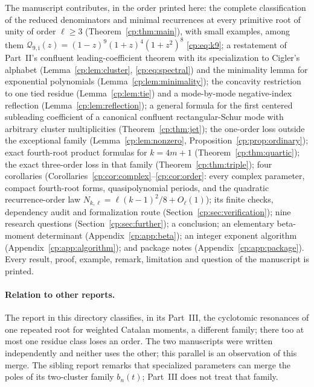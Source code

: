 \documentclass[11pt]{article}
\theoremstyle{definition}
\theoremstyle{remark}
\newcommand{\QQ}{\mathscr Q}
\newcommand{\ii}{\mathrm i}
\theoremstyle{definition}
\theoremstyle{plain}
\numberwithin{equation}{section}
\begin{document}
The manuscript contributes, in the order printed here: the complete
classification of the reduced denominators and minimal recurrences at every
primitive root of unity of order $\ell\ge3$ (Theorem~\ref{cp:thm:main}),
with small examples, among them
$\QQ_{9,\ii}(z)=(1-z)^9(1+z)^4(1+z^2)^8$ \eqref{cp:eq:k9}; a restatement of
Part~II's confluent leading-coefficient theorem with its specialization to
Cigler's alphabet (Lemma~\ref{cp:lem:cluster}, \eqref{cp:eq:spectral}) and
the minimality lemma for exponential polynomials
(Lemma~\ref{cp:lem:minimality}); the concavity restriction to one tied
residue (Lemma~\ref{cp:lem:tie}) and a mode-by-mode negative-index
reflection (Lemma~\ref{cp:lem:reflection}); a general formula for the
first centered subleading coefficient of a canonical confluent
rectangular-Schur mode with arbitrary cluster multiplicities
(Theorem~\ref{cp:thm:jet}); the one-order loss outside the exceptional
family (Lemma~\ref{cp:lem:nonzero}, Proposition~\ref{cp:prop:ordinary});
exact fourth-root product formulas for $k=4m+1$
(Theorem~\ref{cp:thm:quartic}); the exact three-order loss in that family
(Theorem~\ref{cp:thm:triple}); four corollaries
(Corollaries~\ref{cp:cor:complex}--\ref{cp:cor:order}: every complex
parameter, compact fourth-root forms, quasipolynomial periods, and the
quadratic recurrence-order law $N_{k,\ell}=\ell(k-1)^2/8+O_\ell(1)$); its
finite checks, dependency audit and formalization route
(Section~\ref{cp:sec:verification}); nine research questions
(Section~\ref{cp:sec:further}); a conclusion; an elementary beta-moment
determinant (Appendix~\ref{cp:app:beta}); an integer exponent algorithm
(Appendix~\ref{cp:app:algorithm}); and package notes
(Appendix~\ref{cp:app:package}). Every result, proof, example, remark,
limitation and question of the manuscript is printed.

\paragraph{Relation to other reports.} The report
 in this directory classifies, in
its Part~III, the cyclotomic resonances of one repeated root for weighted
Catalan moments, a different family; there too at most one residue class
loses an order. The two manuscripts were written independently and neither
uses the other; this parallel is an observation of this merge. The sibling
report  remarks that specialized parameters
can merge the poles of its two-cluster family $b_n(t)$; Part~III does not
treat that family.
\end{document}
